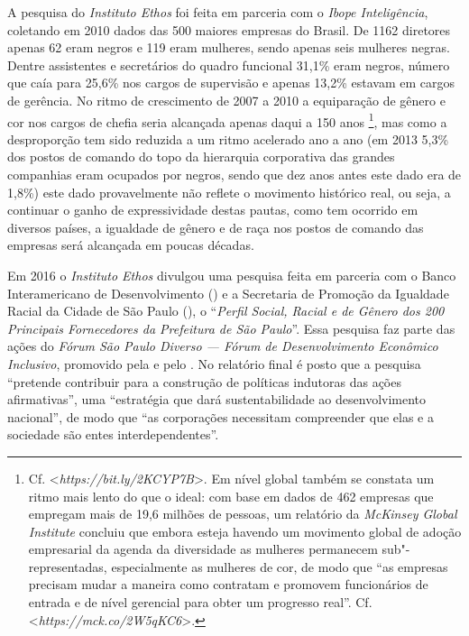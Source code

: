 A pesquisa do \emph{Instituto Ethos} foi feita em parceria com o
\emph{Ibope Inteligência}, coletando em 2010 dados das 500 maiores
empresas do Brasil. De 1162 diretores apenas 62 eram negros e 119 eram
mulheres, sendo apenas seis mulheres negras. Dentre assistentes e
secretários do quadro funcional 31,1\% eram negros, número que caía para
25,6\% nos cargos de supervisão e apenas 13,2\% estavam em cargos de
gerência. No ritmo de crescimento de 2007 a 2010 a equiparação de gênero
e cor nos cargos de chefia seria alcançada apenas daqui a 150 anos
\footnote{Cf. \textless{}\emph{https://bit.ly/2KCYP7B}\textgreater{}.
  Em nível global também se constata um ritmo mais lento do que o ideal:
  com base em dados de 462 empresas que empregam mais de 19,6 milhões de
  pessoas, um relatório da \emph{McKinsey Global Institute} concluiu que
  embora esteja havendo um movimento global de adoção empresarial da
  agenda da diversidade as mulheres permanecem sub"-representadas,
  especialmente as mulheres de cor, de modo que ``as empresas precisam
  mudar a maneira como contratam e promovem funcionários de entrada e de
  nível gerencial para obter um progresso real''. Cf.
  \textless{}\emph{https://mck.co/2W5qKC6}\textgreater{}.},
mas como a desproporção tem sido reduzida a um ritmo acelerado ano a ano
(em 2013 5,3\% dos postos de comando do topo da hierarquia corporativa
das grandes companhias eram ocupados por negros, sendo que dez anos
antes este dado era de 1,8\%) este dado provavelmente não reflete o
movimento histórico real, ou seja, a continuar o ganho de expressividade
destas pautas, como tem ocorrido em diversos países, a igualdade de
gênero e de raça nos postos de comando das empresas será alcançada em
poucas décadas.

Em 2016 o \emph{Instituto Ethos} divulgou uma pesquisa feita em parceria
com o Banco Interamericano de Desenvolvimento () e a Secretaria de
Promoção da Igualdade Racial da Cidade de São Paulo (), o
``\emph{Perfil Social, Racial e de Gênero dos 200 Principais
Fornecedores da Prefeitura de São Paulo}''. Essa pesquisa faz parte das
ações do \emph{Fórum São Paulo Diverso --- Fórum de Desenvolvimento
Econômico Inclusivo}, promovido pela  e pelo . No relatório
final é posto que a pesquisa ``pretende contribuir para a construção de
políticas indutoras das ações afirmativas'', uma ``estratégia que dará
sustentabilidade ao desenvolvimento nacional'', de modo que ``as
corporações necessitam compreender que elas e a sociedade são entes
interdependentes''.

